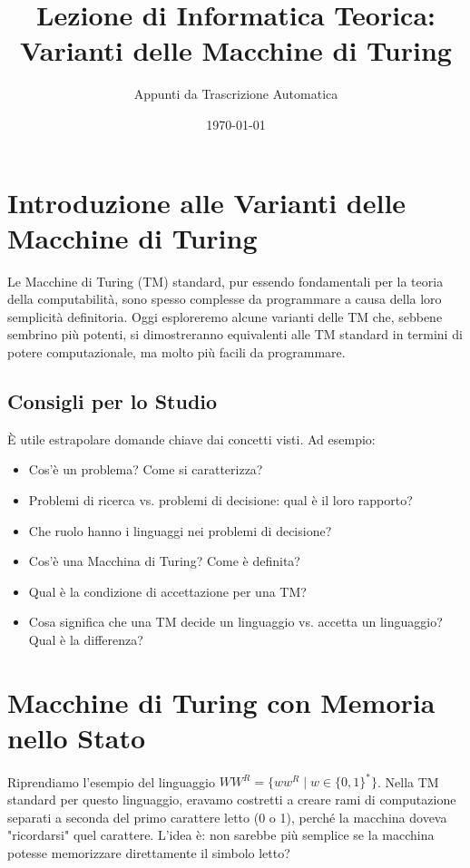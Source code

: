\documentclass[a4paper]{article}
\title{Lezione di Informatica Teorica: Varianti delle Macchine di Turing}
\author{Appunti da Trascrizione Automatica}
\date{\today}
\theoremstyle{definition} %
\begin{document}
\maketitle
\tableofcontents
\newpage

\section{Introduzione alle Varianti delle Macchine di Turing}
Le Macchine di Turing (TM) standard, pur essendo fondamentali per la teoria della computabilità, sono spesso complesse da programmare a causa della loro semplicità definitoria. Oggi esploreremo alcune varianti delle TM che, sebbene sembrino più potenti, si dimostreranno equivalenti alle TM standard in termini di potere computazionale, ma molto più facili da programmare.

\subsection{Consigli per lo Studio}
È utile estrapolare domande chiave dai concetti visti. Ad esempio:
\begin{itemize}
    \item Cos'è un problema? Come si caratterizza?
    \item Problemi di ricerca vs. problemi di decisione: qual è il loro rapporto?
    \item Che ruolo hanno i linguaggi nei problemi di decisione?
    \item Cos'è una Macchina di Turing? Come è definita?
    \item Qual è la condizione di accettazione per una TM?
    \item Cosa significa che una TM decide un linguaggio vs. accetta un linguaggio? Qual è la differenza?
\end{itemize}

\section{Macchine di Turing con Memoria nello Stato}
Riprendiamo l'esempio del linguaggio $WW^R = \{w w^R \mid w \in \{0,1\}^*\}$. Nella TM standard per questo linguaggio, eravamo costretti a creare rami di computazione separati a seconda del primo carattere letto (0 o 1), perché la macchina doveva "ricordarsi" quel carattere. L'idea è: non sarebbe più semplice se la macchina potesse memorizzare direttamente il simbolo letto?
\end{document}

